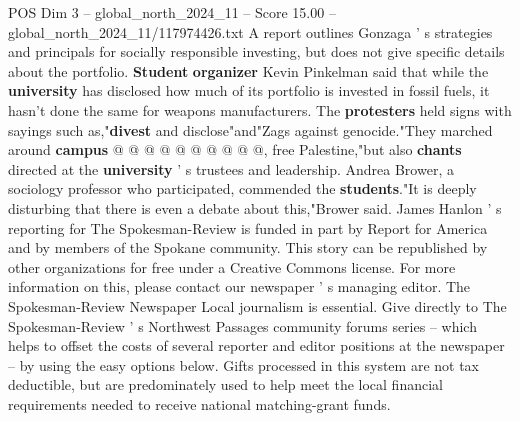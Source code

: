\begin{textsample}{POS Dim 3 – global\_north\_2024\_11 – Score 15.00 – global\_north\_2024\_11/117974426.txt}
A report outlines Gonzaga ' s strategies and principals for socially responsible investing, but does not give specific details about the portfolio. \textbf{Student} \textbf{organizer} Kevin Pinkelman said that while the \textbf{university} has disclosed how much of its portfolio is invested in fossil fuels, it hasn't done the same for weapons manufacturers.
The \textbf{protesters} held signs with sayings such as,"\textbf{divest} and disclose"and"Zags against genocide."They marched around \textbf{campus} @ @ @ @ @ @ @ @ @ @, free Palestine,"but also \textbf{chants} directed at the \textbf{university} ' s trustees and leadership.
Andrea Brower, a sociology professor who participated, commended the \textbf{students}."It is deeply disturbing that there is even a debate about this,"Brower said.
James Hanlon ' s reporting for The Spokesman-Review is funded in part by Report for America and by members of the Spokane community.
This story can be republished by other organizations for free under a Creative Commons license.
For more information on this, please contact our newspaper ' s managing editor.
The Spokesman-Review Newspaper Local journalism is essential.
Give directly to The Spokesman-Review ' s Northwest Passages community forums series -- which helps to offset the costs of several reporter and editor positions at the newspaper -- by using the easy options below.
Gifts processed in this system are not tax deductible, but are predominately used to help meet the local financial requirements needed to receive national matching-grant funds.

\end{textsample}
